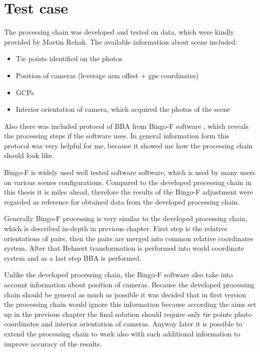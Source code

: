 \documentclass[a4paper,12pt]{article}
\begin{document}
\section{Test case}

The processing chain was developed and tested on data, which were kindly provided by Martin Rehak. The available 
information about scene included:

\begin{itemize}
\item Tie points identified on the photos
\item Position of cameras (leverage arm offset + gps coordinates)
\item GCPs
\item Interior orientation of camera, which acquired the photos of the scene
\end{itemize}

Also there was included protocol of BBA from Bingo-F software \cite{bingo2013gip}, which reveals 
the processing steps if the software uses.
In general information form this protocol was very helpful for me, because 
 it showed me how the processing chain should look like.

Bingo-F is widely used well tested software software, which is used by many users on various  scenes configurations.  
Compared to the developed processing chain in this thesis it is miles ahead, therefore the results of the Bingo-F adjustment were 
regarded as reference for obtained data from the developed processing chain.

Generally Bingo-F processing is very similar to the developed  processing chain, which is  
described in-depth in previous chapter. First step is the relative orientations of pairs, then the pairs are merged into common relative 
coordinates system. After that Helmert transformation is performed into world coordinate system and as a last step BBA is performed.

Unlike the developed processing chain,  the Bingo-F software also take into account information about position of cameras. 
Because the developed processing chain should be general as much as possible it was decided that in first version  the processing chain would ignore this 
information because according the aims set up in the previous chapter the final solution should require only tie points photo coordinates and interior 
orientation of cameras. Anyway later it is possible to extend the processing chain to work also with such additional information to improve accuracy 
of the results. 
\end{document}
